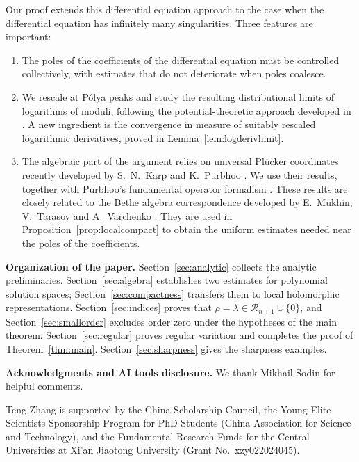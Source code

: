 \documentclass[11pt,letterpaper,reqno]{amsart}
\theoremstyle{remark}
\numberwithin{equation}{section}
\begin{document}
Our proof extends this differential equation approach to the case
when the differential equation has infinitely many singularities. 
Three features are important:
\begin{enumerate}[label=(\arabic*)]
\item
The poles of the coefficients of the differential equation
must be controlled collectively,
with estimates that do not deteriorate when poles coalesce.

\item
We rescale at P\'olya peaks and study the resulting distributional limits
of logarithms of moduli, following the potential-theoretic approach
developed in
\cite{Ere89a,Ere89b,ES91,ES92,Ere93}. A new ingredient is the
convergence in measure of suitably rescaled logarithmic derivatives,
proved in Lemma~\ref{lem:logderivlimit}.

\item
The algebraic part of the argument relies on universal Pl\"ucker
coordinates recently developed by S.~N.~Karp and K.~Purbhoo \cite{KP26}. We use their results,
together with Purbhoo's fundamental operator formalism
\cite[Proposition~2.2]{Pur23}. These results are closely related
to the Bethe algebra correspondence developed by
E.~Mukhin, V.~Tarasov and A.~Varchenko \cite{MTV13}. They are used in
Proposition~\ref{prop:localcompact} to obtain the uniform estimates needed
near the poles of the coefficients.
\end{enumerate}

\medskip
\noindent\textbf{Organization of the paper.}
Section~\ref{sec:analytic} collects the analytic preliminaries.
Section~\ref{sec:algebra} establishes two estimates for polynomial solution
spaces; Section~\ref{sec:compactness} transfers them to local holomorphic
representations. Section~\ref{sec:indices} proves that
$\rho=\lambda\in\mathcal R_{n+1}\cup\{0\}$, and
Section~\ref{sec:smallorder} excludes order zero under the hypotheses of the
main theorem. Section~\ref{sec:regular} proves regular variation and completes
the proof of Theorem~\ref{thm:main}. Section~\ref{sec:sharpness} gives the
sharpness examples.

\medskip
\noindent\textbf{Acknowledgments and AI tools disclosure.}
We thank Mikhail Sodin for helpful comments.

Teng Zhang is supported by the China Scholarship Council, the Young Elite
Scientists Sponsorship Program for PhD Students (China Association for Science
and Technology), and the Fundamental Research Funds for the Central
Universities at Xi'an Jiaotong University (Grant No.~xzy022024045).
\end{document}
